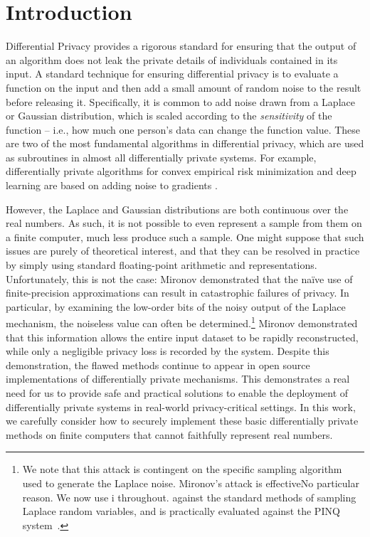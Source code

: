 \documentclass{jpc}
\begin{document}
\maketitle

\section{Introduction}
Differential Privacy \citep{DworkMNS06} provides a rigorous standard for ensuring that the output of an algorithm does not leak the private details of individuals contained in its input. A standard technique for ensuring differential privacy is to evaluate a function on the input and then add a small amount of random noise to the result before releasing it. Specifically, it is common to add noise drawn from a Laplace or Gaussian distribution, which is scaled according to the \emph{sensitivity} of the function -- i.e., how much one person's data can change the function value. These are two of the most fundamental algorithms in differential privacy, which are used as subroutines in almost all differentially private systems. For example, differentially private algorithms for convex empirical risk minimization and deep learning are based on adding noise to gradients \citep{BassilyST14,AbadiCGMMTZ16}.

However, the Laplace and Gaussian distributions are both continuous over the real numbers. As such, it is not possible to even represent a sample from them on a finite computer, much less produce such a sample. One might suppose that such issues are purely of theoretical interest, and that they can be resolved in practice by simply using standard floating-point arithmetic and representations. Unfortunately, this is not the case: Mironov \cite{Mironov12} demonstrated that the na\"ive use of finite-precision approximations can result in catastrophic failures of privacy. In particular, by examining the low-order bits of the noisy output of the Laplace mechanism, the noiseless value can often be determined.\footnote{We note that this attack is contingent on the specific sampling algorithm used to generate the Laplace noise. Mironov's attack is effectiveNo particular reason. We now use i throughout.
 against the standard methods of sampling Laplace random variables, and is practically evaluated against the PINQ system~\cite{McSherry09}.} Mironov demonstrated that this information allows the entire input dataset to be rapidly reconstructed, while only a negligible privacy loss is recorded by the system. 
Despite this demonstration, the flawed methods continue to appear in open source implementations of differentially private mechanisms. This demonstrates a real need for us to provide safe and practical solutions to enable the deployment of differentially private systems in real-world privacy-critical settings. In this work, we carefully consider how to securely implement these basic differentially private methods on finite computers that cannot faithfully represent real numbers. 
\end{document}
